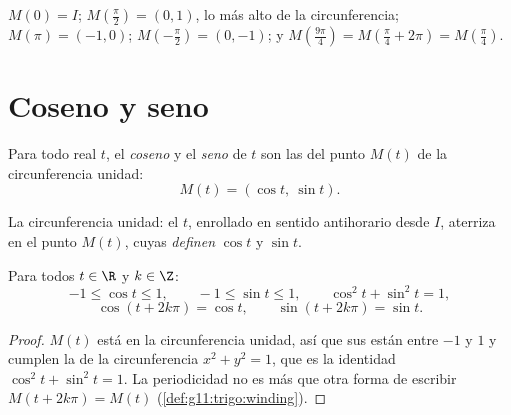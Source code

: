 \begin{example}
$M(0) = I$; $M\!\left(\frac{\pi}{2}\right) = (0, 1)$, lo más alto de la
circunferencia; $M(\pi) = (-1, 0)$; $M\!\left(-\frac{\pi}{2}\right) =
(0, -1)$; y $M\!\left(\frac{9\pi}{4}\right) = M\!\left(\frac{\pi}{4} +
2\pi\right) = M\!\left(\frac{\pi}{4}\right)$.
\end{example}

\section{Coseno y seno}

\begin{definition}\label{def:g11:trigo:cossin}
Para todo real $t$, el \emph{coseno} y el
\emph{seno} de $t$ son las  del punto $M(t)$ de la
circunferencia unidad:
\[
M(t) = (\cos t,\ \sin t).
\]
\end{definition}

\begin{omfigure}

{\small La circunferencia unidad: el  $t$, enrollado en sentido
antihorario desde $I$, aterriza en el punto $M(t)$, cuyas 
\emph{definen} $\cos t$ y $\sin t$.}
\end{omfigure}

\begin{proposition}\label{prop:g11:trigo:first}
Para todos $t \in \R$ y $k \in \Z$:
\[
-1 \leq \cos t \leq 1, \qquad
-1 \leq \sin t \leq 1, \qquad
\cos^2 t + \sin^2 t = 1,
\]
\[
\cos(t + 2k\pi) = \cos t, \qquad \sin(t + 2k\pi) = \sin t .
\]
\end{proposition}

\begin{proof}
$M(t)$ está en la circunferencia unidad, así que sus  están
entre $-1$ y $1$ y cumplen la  de la circunferencia
$x^2 + y^2 = 1$, que es la identidad $\cos^2 t + \sin^2 t = 1$. La
periodicidad no es más que otra forma de escribir
$M(t + 2k\pi) = M(t)$ (\cref{def:g11:trigo:winding}).
\end{proof}

